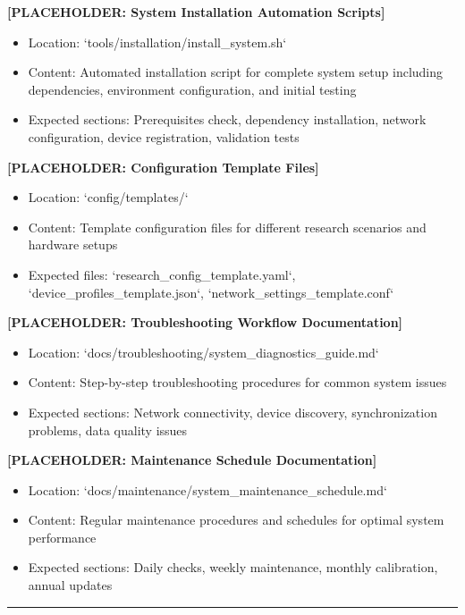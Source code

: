 \documentclass[11pt,a4paper]{article}
\begin{document}
\textbf{[PLACEHOLDER: System Installation Automation Scripts]}

\begin{itemize}
\item Location: `tools/installation/install_system.sh`
\item Content: Automated installation script for complete system setup including dependencies, environment configuration,
  and initial testing
\item Expected sections: Prerequisites check, dependency installation, network configuration, device registration,
  validation tests

\end{itemize}
\textbf{[PLACEHOLDER: Configuration Template Files]}

\begin{itemize}
\item Location: `config/templates/`
\item Content: Template configuration files for different research scenarios and hardware setups
\item Expected files: `research_config_template.yaml`, `device_profiles_template.json`, `network_settings_template.conf`

\end{itemize}
\textbf{[PLACEHOLDER: Troubleshooting Workflow Documentation]}

\begin{itemize}
\item Location: `docs/troubleshooting/system_diagnostics_guide.md`
\item Content: Step-by-step troubleshooting procedures for common system issues
\item Expected sections: Network connectivity, device discovery, synchronization problems, data quality issues

\end{itemize}
\textbf{[PLACEHOLDER: Maintenance Schedule Documentation]}

\begin{itemize}
\item Location: `docs/maintenance/system_maintenance_schedule.md`
\item Content: Regular maintenance procedures and schedules for optimal system performance
\item Expected sections: Daily checks, weekly maintenance, monthly calibration, annual updates

\end{itemize}
\hrule
\end{document}
